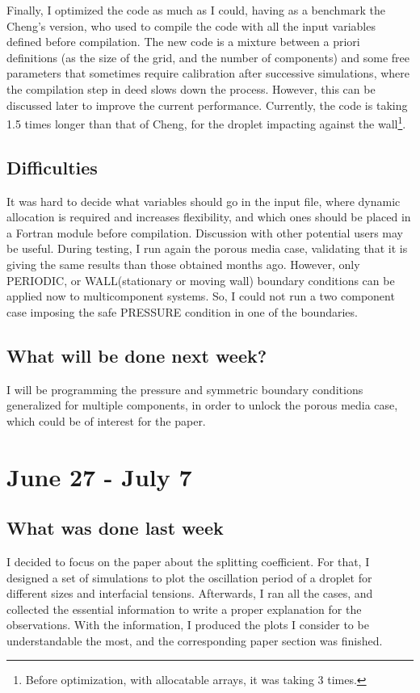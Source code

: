 \documentclass[12pt]{article}
\begin{document}
	Finally, I optimized the code as much as I could, having as a benchmark the Cheng's version, who used to compile the code with all the input variables defined before compilation. The new code is a mixture between a priori definitions (as the size of the grid, and the number of components) and some free parameters that sometimes require calibration after successive simulations, where the compilation step in deed slows down the process. However, this can be discussed later to improve the current performance. Currently, the code is taking 1.5 times longer than that of Cheng, for the droplet impacting against the wall\footnote{Before optimization, with allocatable arrays, it was taking 3 times.}. 

	\subsection*{Difficulties}
	It was hard to decide what variables should go in the input file, where dynamic allocation is required and increases flexibility, and which ones should be placed in a Fortran module before compilation. Discussion with other potential users may be useful. During testing, I run again the porous media case, validating that it is giving the same results than those obtained months ago. However, only PERIODIC, or WALL(stationary or moving wall) boundary conditions can be applied now to multicomponent systems. So, I could not run a two component case imposing the safe PRESSURE condition in one of the boundaries. 


	\subsection*{What will be done next week?}
	I will be programming the pressure and symmetric boundary conditions generalized for multiple components, in order to unlock the porous media case, which could be of interest for the paper. 
	
	\pagebreak
	\section*{June 27 - July 7}
	\subsection*{What was done last week}
	I decided to focus on the paper about the splitting coefficient. For that, I designed a set of simulations to plot the oscillation period of a droplet for different sizes and interfacial tensions. Afterwards, I ran all the cases, and collected the essential information to write a proper explanation for the observations. With the information, I produced the plots I consider to be understandable the most, and the corresponding paper section  was finished. 
	
\end{document}
